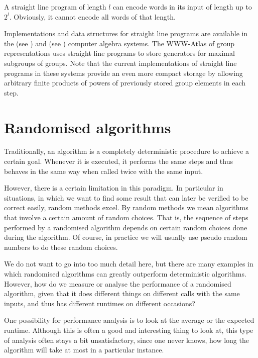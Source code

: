 \begin{Rem}
A straight line program of length $l$ can encode words in its input
of length up to $2^l$. Obviously, it cannot encode all words of that
length.
\end{Rem}

Implementations and data structures for straight line programs are
available in the {\GAP} (see \cite{GAP4}) and {\MAGMA} (see \cite{Magma})
computer algebra systems. The
WWW-Atlas of group representations uses straight line programs to
store generators for maximal subgroups of groups. Note that the
current implementations of straight line programs in these systems
provide an even more compact storage by allowing arbitrary finite
products of powers of previously stored group elements in each step.


\section{Randomised algorithms}
\label{montevegas}

Traditionally, an algorithm is a completely deterministic procedure to
achieve a certain goal. Whenever it is executed, it performs the same
steps and thus behaves in the same way when called twice with the same input.

However, there is a certain limitation in this paradigm. In particular
in situations, in which we want to find some result that can later
be verified to be correct easily, random methods excel. By random
methods we mean algorithms that involve a certain amount of random
choices. That is, the sequence of steps performed by a randomised
algorithm depends on certain random choices done during the algorithm.
Of course, in practice we will usually use pseudo random numbers to
do these random choices.

We do not want to go into too much detail here, but there are many
examples in which randomised algorithms can greatly outperform
deterministic algorithms. However, how do we measure or analyse
the performance of a randomised algorithm, given that it does
different things on different calls with the same inputs, and thus
has different runtimes on different occasions?

One possibility for performance analysis is to look at the average
or the expected runtime. Although this is often a good and
interesting thing to look at, this type of analysis often stays a
bit unsatisfactory, since one never knows, how long the algorithm will
take at most in a particular instance.

